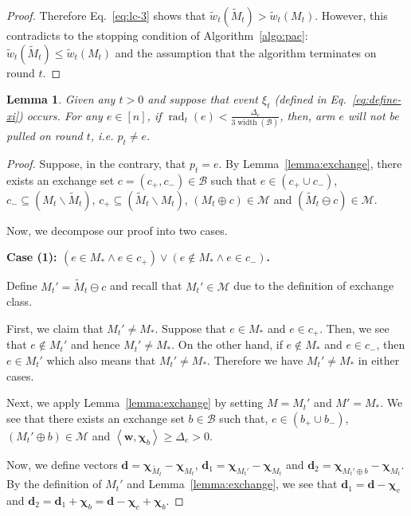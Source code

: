 \documentclass{article}
\newtheorem{lemma}{Lemma}
\newcommand{\M}{\mathcal M}
\newcommand{\B}{\mathcal B}
\newcommand{\del}{\backslash}
\DeclareMathOperator{\rank}{width}
\DeclareMathOperator{\rad}{rad}
\newcommand{\inn}[1]{\left\langle #1 \right\rangle}
\renewcommand{\vec}[1]{\boldsymbol{#1}}
\begin{document}
\begin{spacing}{1.1}
\begin{proof}
Therefore Eq.~\eqref{eq:lc-3} shows that $\tilde w_t(\tilde M_t) > \tilde w_t(M_t)$. 
However, this contradicts to the stopping condition of Algorithm~\ref{algo:pac}: $\tilde w_t(\tilde M_t) \le \tilde w_t(M_t)$ and the assumption that the algorithm terminates on round $t$.
\end{proof}




\begin{lemma}
\label{lemma:key-technical}
Given any $t>0$ and suppose that event $\xi_t$ (defined in Eq.~\eqref{eq:define-xi})  occurs.
For any $e\in [n]$, if $\rad_t(e) < \frac{\Delta_e}{3\rank(\B)}$, then, arm $e$ will not be pulled on round $t$, i.e. $p_t\not= e$.
\end{lemma}

\begin{proof}
Suppose, in the contrary, that $p_t = e$.
By Lemma~\ref{lemma:exchange}, there exists an exchange set $c=(c_+,c_-) \in \B$
such that $e\in (c_+\cup c_-)$, $c_- \subseteq (M_t \del \tilde M_t)$, $c_+ \subseteq (\tilde M_t \del M_t)$, $(M_t\oplus c) \in \M$ and $(\tilde M_t \ominus c) \in \M$.


Now, we decompose our proof into two cases.

\textbf{Case (1): $(e \in M_* \wedge e\in c_+) \vee (e \not \in M_* \wedge e\in c_-)$.}

Define $M_t' = \tilde M_t \ominus c$ and recall that $M_t' \in \M$ due to the definition of exchange class.

First, we claim that $M_t'\not= M_*$.
Suppose that $e\in M_*$ and $e\in c_+$.
Then, we see that $e\not\in M_t'$ and hence $M_t'\not=M_*$.
On the other hand, if $e\not \in M_*$ and $e\in c_-$, then $e\in M_t'$ which also means that $M_t'\not= M_*$.
Therefore we have $M_t'\not=M_*$ in either cases.


Next, we apply Lemma~\ref{lemma:exchange} by setting $M=M_t'$ and $M'=M_*$.
We see that there exists an exchange set $b\in \B$ such that, $e\in (b_+\cup b_-)$, $(M_t' \oplus b) \in \M$ and
 $\inn{\vec w, \vec \chi_b} \ge \Delta_e > 0$.
 
Now, we define vectors $\vec d = \vec \chi_{\tilde M_t} - \vec \chi_{M_t}$, $\vec d_1 = \vec\chi_{M_t'}-\vec\chi_{M_t}$ and $\vec d_2 = \vec\chi_{M_t'\oplus b}-\vec\chi_{M_t}$.
By the definition of $M_t'$ and Lemma~\ref{lemma:exchange}, we see that $\vec d_1 = \vec d - \vec \chi_{c}$ and $\vec d_2 = \vec d_1+\vec \chi_b = \vec d-\vec \chi_c+\vec \chi_b$.



\end{proof}
\end{spacing}
\end{document}
